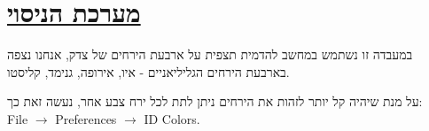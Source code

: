 \documentclass[a4paper, 12pt]{article}
\begin{document}
    \vfill


    \pagebreak %

    \section{\underline{מערכת הניסוי}}
    \begin{flushright}
        במעבדה זו נשתמש במחשב להדמית תצפית על ארבעת הירחים של צדק,
        אנחנו נצפה בארבעת הירחים הגליליאניים - איו, אירופה, גנימד, קליסטו.

        על מנת שיהיה קל יותר לזהות את הירחים ניתן לתת לכל ירח צבע אחר, נעשה זאת כך:\\
        \textenglish{File $\rightarrow$ Preferences $\rightarrow$ ID Colors}.
    \end{flushright}
\end{document}
